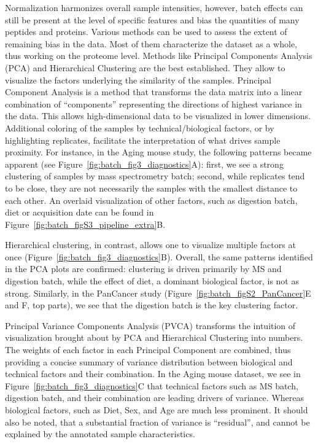 \documentclass[num-refs]{wiley-article}
\begin{document}
Normalization harmonizes overall sample intensities, however, batch effects can still be present at the level of specific features and bias the quantities of many peptides and proteins.
Various methods can be used to assess the extent of remaining bias in the data. Most of them characterize the dataset as a whole, thus working on the proteome level. Methods like Principal Components Analysis (PCA) and Hierarchical Clustering are the best  established. They allow to visualize the factors underlying the similarity of the samples.
Principal Component Analysis is a method that transforms the data matrix into a linear combination of “components” representing the directions of highest variance in the data. This allows high-dimensional data to be visualized in lower dimensions. Additional coloring of the samples by technical/biological factors, or by highlighting replicates, facilitate the interpretation of what drives sample proximity. For instance, in the Aging mouse study, the following patterns became apparent (see Figure~\ref{fig:batch_fig3_diagnostics}A): first, we see a strong clustering of samples by mass spectrometry batch; second, while replicates tend to be close, they are not necessarily the samples with the smallest distance to each other. An overlaid visualization of other factors, such as digestion batch, diet or acquisition date can be found in Figure~\ref{fig:batch_figS3_pipeline_extra}B. 
 
Hierarchical clustering, in contrast, allows one to visualize multiple factors at once (Figure~\ref{fig:batch_fig3_diagnostics}B). Overall, the same patterns identified in the PCA plots are confirmed: clustering is driven primarily by MS and digestion batch, while the effect of diet, a dominant biological factor, is not as strong. Similarly, in the PanCancer study (Figure~\ref{fig:batch_figS2_PanCancer}{E and F, top parts}), we see that the digestion batch is the key clustering factor.

Principal Variance Components Analysis (PVCA) transforms the intuition of visualization brought about by PCA and Hierarchical Clustering into numbers. The weights of each factor in each Principal Component are combined, thus providing a concise summary of variance distribution between biological and technical factors and their combination. In the Aging mouse dataset, we see in Figure~\ref{fig:batch_fig3_diagnostics}C that technical factors such as MS batch, digestion batch, and their combination are leading drivers of variance. Whereas biological factors, such as Diet, Sex, and Age are much less prominent. It should also be noted, that a substantial fraction of variance is “residual”, and cannot be explained by the annotated sample characteristics.
\end{document}
